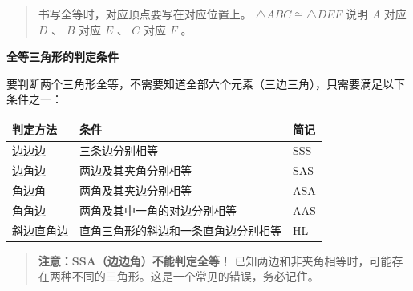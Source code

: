\begin{quote}
书写全等时，对应顶点要写在对应位置上。 $\triangle ABC \cong \triangle DEF$ 说明 $A$ 对应 $D$ 、 $B$ 对应 $E$ 、 $C$ 对应 $F$ 。
\end{quote}


\textbf{全等三角形的判定条件}

要判断两个三角形全等，不需要知道全部六个元素（三边三角），只需要满足以下条件之一：

\begin{center}
\begin{tabular}{lll}
\toprule
判定方法 & 条件 & 简记 \\
\midrule
边边边 & 三条边分别相等 & SSS \\
边角边 & 两边及其夹角分别相等 & SAS \\
角边角 & 两角及其夹边分别相等 & ASA \\
角角边 & 两角及其中一角的对边分别相等 & AAS \\
斜边直角边 & 直角三角形的斜边和一条直角边分别相等 & HL \\
\bottomrule
\end{tabular}
\end{center}


\begin{quote}\textbf{注意：}\textbf{SSA（边边角）不能判定全等！} 已知两边和非夹角相等时，可能存在两种不同的三角形。这是一个常见的错误，务必记住。\end{quote}


